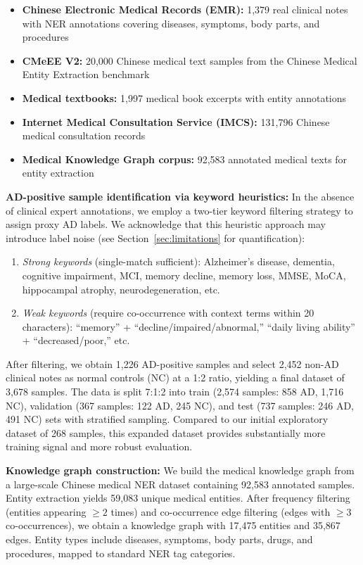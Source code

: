 \documentclass[11pt,onecolumn,a4paper]{article}
\begin{document}
\begin{itemize}[leftmargin=*]
    \item \textbf{Chinese Electronic Medical Records (EMR):} 1,379 real clinical notes with NER annotations covering diseases, symptoms, body parts, and procedures
    \item \textbf{CMeEE V2:} 20,000 Chinese medical text samples from the Chinese Medical Entity Extraction benchmark \cite{zhang2022cblue}
    \item \textbf{Medical textbooks:} 1,997 medical book excerpts with entity annotations
        \item \textbf{Internet Medical Consultation Service (IMCS):} 131,796 Chinese medical consultation records
        \item \textbf{Medical Knowledge Graph corpus:} 92,583 annotated medical texts for entity extraction
    \end{itemize}

\textbf{AD-positive sample identification via keyword heuristics:} In the absence of clinical expert annotations, we employ a two-tier keyword filtering strategy to assign proxy AD labels. We acknowledge that this heuristic approach may introduce label noise (see Section~\ref{sec:limitations} for quantification):
\begin{enumerate}
    \item \textit{Strong keywords} (single-match sufficient): Alzheimer's disease, dementia, cognitive impairment, MCI, memory decline, memory loss, MMSE, MoCA, hippocampal atrophy, neurodegeneration, etc.
    \item \textit{Weak keywords} (require co-occurrence with context terms within 20 characters): ``memory'' + ``decline/impaired/abnormal,'' ``daily living ability'' + ``decreased/poor,'' etc.
\end{enumerate}

After filtering, we obtain 1,226 AD-positive samples and select 2,452 non-AD clinical notes as normal controls (NC) at a 1:2 ratio, yielding a final dataset of 3,678 samples. The data is split 7:1:2 into train (2,574 samples: 858 AD, 1,716 NC), validation (367 samples: 122 AD, 245 NC), and test (737 samples: 246 AD, 491 NC) sets with stratified sampling. Compared to our initial exploratory dataset of 268 samples, this expanded dataset provides substantially more training signal and more robust evaluation.

\textbf{Knowledge graph construction:} We build the medical knowledge graph from a large-scale Chinese medical NER dataset containing 92,583 annotated samples. Entity extraction yields 59,083 unique medical entities. After frequency filtering (entities appearing $\geq 2$ times) and co-occurrence edge filtering (edges with $\geq 3$ co-occurrences), we obtain a knowledge graph with 17,475 entities and 35,867 edges. Entity types include diseases, symptoms, body parts, drugs, and procedures, mapped to standard NER tag categories.
\end{document}
